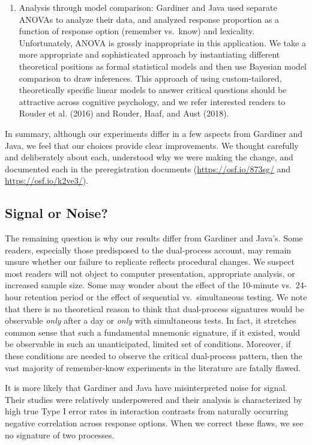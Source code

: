 \documentclass[english,,man]{apa6}
\begin{document}
\begin{enumerate}
\item
  Analysis through model comparison: Gardiner and Java used separate ANOVAs to analyze their data, and analyzed response proportion as a function of response option (remember vs.~know) and lexicality. Unfortunately, ANOVA is grossly inappropriate in this application.
  We take a more appropriate and sophisticated approach by instantiating different theoretical positions as formal statistical models and then use Bayesian model comparison to draw inferences. This approach of using custom-tailored, theoretically specific linear models to answer critical questions should be attractive across cognitive psychology, and we refer interested readers to Rouder et al. (2016) and Rouder, Haaf, and Aust (2018).
\end{enumerate}

In summary, although our experiments differ in a few aspects from Gardiner and Java, we feel that our choices provide clear improvements. We thought carefully and deliberately about each, understood why we were making the change, and documented each in the preregistration documents (\url{https://osf.io/873sg/} and \url{https://osf.io/k2ve3/}).

\hypertarget{signal-or-noise}{%
\subsection{Signal or Noise?}\label{signal-or-noise}}

The remaining question is why our results differ from Gardiner and Java's. Some readers, especially those predisposed to the dual-process account, may remain unsure whether our failure to replicate reflects procedural changes. We suspect most readers will not object to computer presentation, appropriate analysis, or increased sample size. Some may wonder about the effect of the 10-minute vs.~24-hour retention period or the effect of sequential vs.~simultaneous testing. We note that there is no theoretical reason to think that dual-process signatures would be observable \emph{only} after a day or \emph{only} with simultaneous tests. In fact, it stretches common sense that such a fundamental mnemonic signature, if it existed, would be observable in such an unanticipated, limited set of conditions. Moreover, if these conditions are needed to observe the critical dual-process pattern, then the vast majority of remember-know experiments in the literature are fatally flawed.

It is more likely that Gardiner and Java have misinterpreted noise for signal. Their studies were relatively underpowered and their analysis is characterized by high true Type I error rates in interaction contrasts from naturally occurring negative correlation across response options. When we correct these flaws, we see no signature of two processes.
\end{document}
